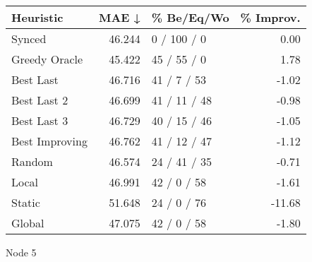 \begin{tabular}{lrlr}
\toprule
\textbf{Heuristic} & \textbf{MAE ↓} & \textbf{\% Be/Eq/Wo} & \textbf{\% Improv.} \\
\midrule
            Synced &         46.244 &          0 / 100 / 0 &                0.00 \\
     Greedy Oracle &         45.422 &          45 / 55 / 0 &                1.78 \\
         Best Last &         46.716 &          41 / 7 / 53 &               -1.02 \\
       Best Last 2 &         46.699 &         41 / 11 / 48 &               -0.98 \\
       Best Last 3 &         46.729 &         40 / 15 / 46 &               -1.05 \\
    Best Improving &         46.762 &         41 / 12 / 47 &               -1.12 \\
            Random &         46.574 &         24 / 41 / 35 &               -0.71 \\
             Local &         46.991 &          42 / 0 / 58 &               -1.61 \\
            Static &         51.648 &          24 / 0 / 76 &              -11.68 \\
            Global &         47.075 &          42 / 0 / 58 &               -1.80 \\
\bottomrule
\end{tabular}
\caption{Node 5}
\label{tab:iid_lr05_le2_bs2_5}
